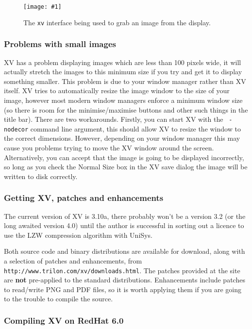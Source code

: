 \documentclass[twoside,11pt]{article}
\newcommand{\htmladdnormallink}[2]{#1}
\newcommand{\htmladdimg}[1]{}
\newcommand{\htmlref}[2]{#1}
\newcommand{\latex}[1]{#1}
\newcommand{\myfig}[5]{
  \begin{figure}
    \centering\texttt{[image: \#1]}
    \typeout{#1 inserted on page \arabic{page}}
    \caption{\label{#4}#5}
  \end{figure}
  }
\newcommand{\myfig}[5]{
    \label{#4} \htmladdimg{#3}\\
    Figure: #5\\
  }
\begin{document}
\myfig{sc15_xv_capture.eps}{height=0.4\textheight}{sc15_xv_capture.gif}{sc15_xv_capture}{The {\tt xv} interface being used to grab an image from the display.}

\subsubsection{Problems with small images}

XV has a problem displaying images which are less than 100 pixels
wide, it will actually stretch the images to this minimum size if you
try and get it to display something smaller. This problem is due to
your window manager rather than XV itself. XV tries to automatically
resize the image window to the size of your image, however most modern
window managers enforce a minimum window size (so there is room for
the minimise/maximise buttons and other such things in the title bar).
There are two workarounds. Firstly, you can start XV with the {\tt
-nodecor} command line argument, this should allow XV to resize the
window to the correct dimensions. However, depending on your window
manager this may cause you problems trying to move the XV window
around the screen. Alternatively, you can accept that the image is
going to be displayed incorrectly, so long as you check the {\sc
Normal Size} box in the XV save dialog the image will be written to
disk correctly.

\subsubsection{Getting XV, patches and enhancements}

The current version of XV is 3.10a, there probably won't be a version
3.2 (or the long awaited version 4.0) until the author is successful
in sorting out a \htmlref{licence}{sc15_giflegal} to use the LZW
compression algorithm with UniSys.

Both source code and binary distributions are available for
\htmladdnormallink{download}{http://www.trilon.com/xv/downloads.html},
along with a selection of patches and enhancements\latex{, from {\tt
http://www.trilon.com/xv/downloads.html}}. The patches provided at the
site are {\bf not} pre-applied to the standard distributions.
Enhancements include patches to read/write PNG and PDF files, so it is
worth applying them if you are going to the trouble to compile the
source.

\subsubsection{Compiling XV on RedHat 6.0}
\end{document}
